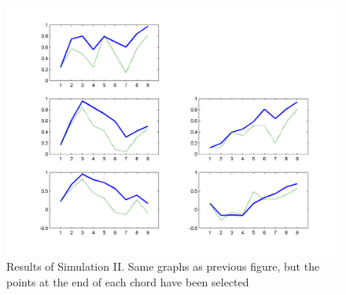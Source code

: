 \begin{figure}[]
    \centering
    \includegraphics[width=\IPEMDefaultFigureWidth]{Graphics/TonalityDemoFig101}
    \caption{Results of Simulation II. Same graphs as previous figure, but the points
    at the end of each chord have been selected}
    \label{Fig:TonalityDemoFig101}
\end{figure}

